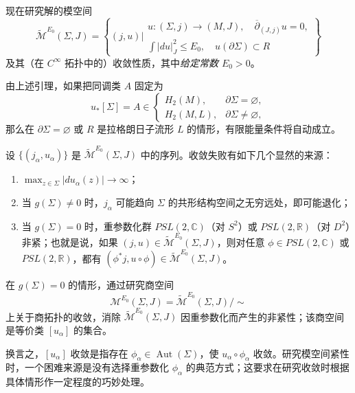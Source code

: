 现在研究解的模空间
\begin{equation}
 \widetilde{\mathcal M}^{E_0}(\Sigma,J)
 =\left\{(j,u)\mathrel{\Big|}
 \begin{array}{l}
 u:(\Sigma,j)\to(M,J),\quad \overline\partial_{(J,j)}u=0,\\
 \displaystyle\int|du|_J^2\leq E_0,\quad u(\partial\Sigma)\subset R
 \end{array}\right\}
 \label{eq:bounded-energy-moduli-space}
\end{equation}
及其（在 $C^\infty$ 拓扑中的）收敛性质，其中\emph{给定常数 $E_0>0$}。

\begin{remark}\label{rem:finite-energy-automatic-fixed-class}
由上述引理，如果把同调类 $A$ 固定为
\[
 u_*[\Sigma]=A\in
 \begin{cases}
 H_2(M),&\partial\Sigma=\varnothing,\\
 H_2(M,L),&\partial\Sigma\ne\varnothing,
 \end{cases}
\]
那么在 $\partial\Sigma=\varnothing$ 或 $R$ 是拉格朗日子流形 $L$ 的情形，有限能量条件将自动成立。
\end{remark}

设 $\{(j_\alpha,u_\alpha)\}$ 是 $\widetilde{\mathcal M}^{E_0}(\Sigma,J)$ 中的序列。收敛失败有如下几个显然的来源：
\begin{enumerate}[label=(\arabic*)]
 \item $\max_{z\in\Sigma}|du_\alpha(z)|\to\infty$；
 \item 当 $g(\Sigma)\ne0$ 时，$j_\alpha$ 可能趋向 $\Sigma$ 的共形结构空间之无穷远处，即可能退化；
 \item 当 $g(\Sigma)=0$ 时，重参数化群 $PSL(2,\mathbb C)$（对 $S^2$）或 $PSL(2,\mathbb R)$（对 $D^2$）非紧；也就是说，如果
 $(j,u)\in\widetilde{\mathcal M}^{E_0}(\Sigma,J)$，则对任意
 $\phi\in PSL(2,\mathbb C)$ 或 $PSL(2,\mathbb R)$，都有
 $(\phi^*j,u\circ\phi)\in\widetilde{\mathcal M}^{E_0}(\Sigma,J)$。
\end{enumerate}

在 $g(\Sigma)=0$ 的情形，通过研究商空间
\[
 \mathcal M^{E_0}(\Sigma,J)
 =\widetilde{\mathcal M}^{E_0}(\Sigma,J)/\sim
\]
上关于商拓扑的收敛，消除 $\widetilde{\mathcal M}^{E_0}(\Sigma,J)$ 因重参数化而产生的非紧性；该商空间是等价类 $[u_\alpha]$ 的集合。

换言之，$[u_\alpha]$ 收敛是指存在 $\phi_\alpha\in\operatorname{Aut}(\Sigma)$，使 $u_\alpha\circ\phi_\alpha$ 收敛。研究模空间紧性时，一个困难来源是没有选择重参数化 $\phi_\alpha$ 的典范方式；这要求在研究收敛时根据具体情形作一定程度的巧妙处理。
